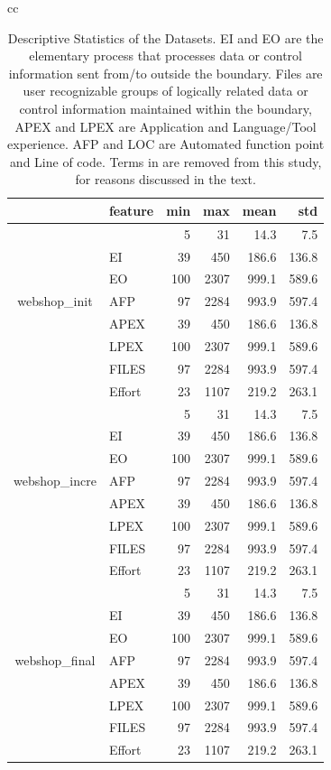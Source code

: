 \documentclass[sigconf,review]{acmart}
\begin{document}
\begin{table}[t!]
{\begin{tabular}{cc}
~

\scriptsize
\begin{tabular}{|c|l|rrrr|}
    \hline
      & feature
    & min  & max & mean & std\\
  \hline
\multirow{7}{*}{\begin{sideways}webshop\_init\end{sideways}}
& \IT{LOC} & 5 & 31 & 14.3 & 7.5\\
& EI & 39 & 450 & 186.6 & 136.8\\
& EO & 100 & 2307 & 999.1 & 589.6\\
& AFP & 97 & 2284 & 993.9 & 597.4\\
& APEX & 39 & 450 & 186.6 & 136.8\\
& LPEX & 100 & 2307 & 999.1 & 589.6\\
& FILES & 97 & 2284 & 993.9 & 597.4\\
& Effort & 23 & 1107 & 219.2 & 263.1\\
\hline
\multirow{7}{*}{\begin{sideways}webshop\_incre\end{sideways}}
& \IT{LOC} & 5 & 31 & 14.3 & 7.5\\
& EI & 39 & 450 & 186.6 & 136.8\\
& EO & 100 & 2307 & 999.1 & 589.6\\
& AFP & 97 & 2284 & 993.9 & 597.4\\
& APEX & 39 & 450 & 186.6 & 136.8\\
& LPEX & 100 & 2307 & 999.1 & 589.6\\
& FILES & 97 & 2284 & 993.9 & 597.4\\
& Effort & 23 & 1107 & 219.2 & 263.1\\
\hline
\multirow{7}{*}{\begin{sideways}webshop\_final\end{sideways}}
& \IT{LOC} & 5 & 31 & 14.3 & 7.5\\
& EI & 39 & 450 & 186.6 & 136.8\\
& EO & 100 & 2307 & 999.1 & 589.6\\
& AFP & 97 & 2284 & 993.9 & 597.4\\
& APEX & 39 & 450 & 186.6 & 136.8\\
& LPEX & 100 & 2307 & 999.1 & 589.6\\
& FILES & 97 & 2284 & 993.9 & 597.4\\
& Effort & 23 & 1107 & 219.2 & 263.1\\
\hline
\end{tabular} 
\end{tabular}
}
\caption{Descriptive Statistics of the Datasets. EI and EO are the elementary process that processes data or control information sent from/to outside the boundary. Files are user recognizable groups of logically related data or control information maintained within the boundary, APEX and LPEX are Application and Language/Tool experience. AFP and LOC are Automated function point and Line of code. Terms in  are removed from this study, for reasons discussed in the text.}\label{table:dataset}
\end{table}
\end{document}
